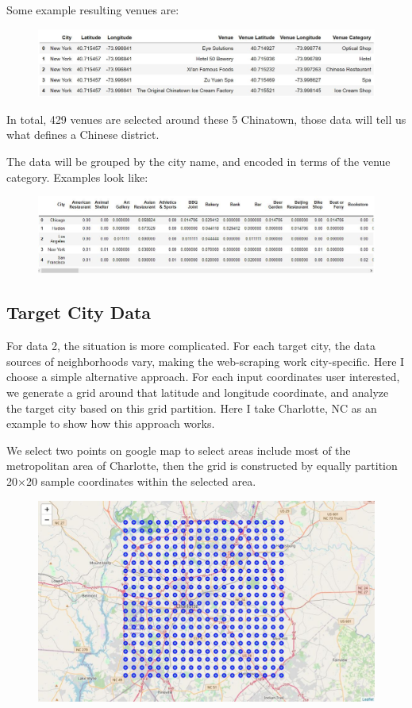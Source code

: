 \documentclass{article}
\begin{document}
Some example resulting venues are:
\begin{figure}[h!]
\includegraphics[width=1.0\textwidth]{c2.jpg}
\centering
\end{figure}

In total, 429 venues are selected around these 5 Chinatown, those data will tell us what defines a Chinese district.

\newpage

The data will be grouped by the city name, and encoded in terms of the venue category. Examples look like:
\begin{figure}[h!]
\includegraphics[width=1.0\textwidth]{c2_1.jpg}
\centering
\end{figure}

\subsection{Target City Data}

For data 2, the situation is more complicated.
For each target city, the data sources of neighborhoods vary, making the web-scraping work city-specific.
Here I choose a simple alternative approach.
For each input coordinates user interested, we generate a grid around that latitude and longitude coordinate, and analyze the target city based on this grid partition.
Here I take Charlotte, NC as an example to show how this approach works.

We select two points on google map to select areas include most of the metropolitan area of Charlotte, then the grid is constructed by equally partition 20$\times$20 sample coordinates within the selected area.
\begin{figure}[h!]
\includegraphics[width=1.0\textwidth]{c3.jpg}
\centering
\end{figure}
\end{document}
